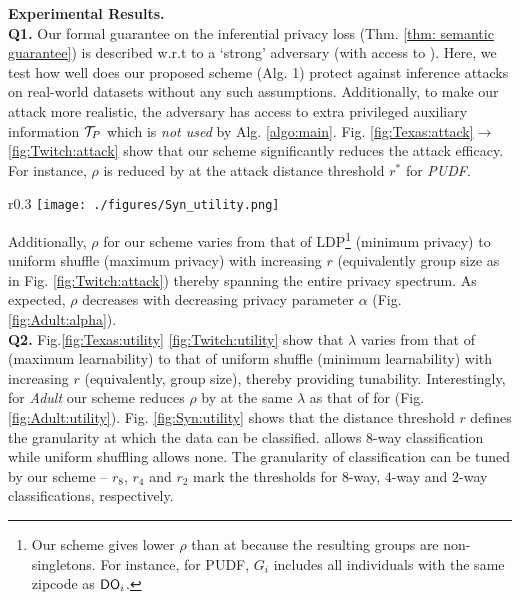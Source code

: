 \textbf{Experimental Results.}
\\\textbf{Q1.} Our formal guarantee on the inferential privacy loss (Thm. \ref{thm: semantic guarantee}) is described w.r.t to a `strong' adversary (with access to  ). Here, we test how well does our proposed scheme (Alg. 1) protect against inference attacks on real-world datasets without any such assumptions. Additionally, to make our attack more realistic, the adversary has access to extra privileged auxiliary information $\mathcal{T}_P$ which is \textit{not used} by Alg. \ref{algo:main}.  Fig. \ref{fig:Texas:attack}$\rightarrow$ \ref{fig:Twitch:attack} show  that our scheme significantly reduces the attack efficacy. For instance, $\rho$ is reduced by \scalebox{1}{$2.7X$} at the attack distance threshold $r^*$ for \textit{PUDF}.  \begin{wrapfigure}{r}{0.3\linewidth}
     \vspace{-0.4cm}
    \hspace{-0.8cm}
    \centering
    \texttt{[image: ./figures/Syn\_utility.png]} 
    \vspace{-0.3cm}
    \caption{\textit{Syn}: Learnability}%
    \label{fig:Syn:utility}
    \vspace{-1.5em}
\end{wrapfigure} Additionally, $\rho$ for our scheme varies from that of \textsf{LDP}\footnote{Our scheme gives lower $\rho$ than \ldp at \scalebox{1}{$r=0$} because the resulting groups are non-singletons. For instance, for PUDF, $G_i$ includes all individuals with the same zipcode as $\textsf{DO}_i$.} (minimum privacy)   to uniform shuffle (maximum privacy) with increasing $r$ (equivalently group size as in Fig. \ref{fig:Twitch:attack}) thereby spanning the entire privacy spectrum. As expected, $\rho$ decreases with decreasing privacy parameter $\alpha$ (Fig. \ref{fig:Adult:alpha}).
\\\textbf{Q2.} Fig.\ref{fig:Texas:utility} \scalebox{1}{$\rightarrow$} \ref{fig:Twitch:utility} show that $\lambda$ varies from that of \ldp (maximum learnability) to that of uniform shuffle (minimum learnability) with increasing $r$ (equivalently, group size), thereby providing tunability.  Interestingly, for \textit{Adult} our scheme reduces $\rho$ by \scalebox{1}{$1.7X$} at the same $\lambda$ as that of \ldp for \scalebox{1}{$r=1$} (Fig. \ref{fig:Adult:utility}). Fig. \ref{fig:Syn:utility} shows that the distance threshold $r$ defines the granularity at which the data can be classified. \ldp allows 8-way classification while uniform shuffling allows none. The granularity of classification can be tuned by our scheme -- $r_8$, $r_4$ and $r_2$ mark the thresholds for $8$-way, $4$-way and $2$-way classifications, respectively. %


